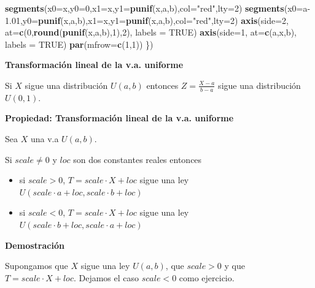 \documentclass[]{book}
\newenvironment{Shaded}{\begin{snugshade}}{\end{snugshade}}
\newcommand{\DataTypeTok}[1]{\textcolor[rgb]{0.13,0.29,0.53}{#1}}
\newcommand{\DecValTok}[1]{\textcolor[rgb]{0.00,0.00,0.81}{#1}}
\newcommand{\FloatTok}[1]{\textcolor[rgb]{0.00,0.00,0.81}{#1}}
\newcommand{\KeywordTok}[1]{\textcolor[rgb]{0.13,0.29,0.53}{\textbf{#1}}}
\newcommand{\NormalTok}[1]{#1}
\newcommand{\OtherTok}[1]{\textcolor[rgb]{0.56,0.35,0.01}{#1}}
\newcommand{\StringTok}[1]{\textcolor[rgb]{0.31,0.60,0.02}{#1}}
\providecommand{\tightlist}{%
  \setlength{\itemsep}{0pt}\setlength{\parskip}{0pt}}
\begin{document}
\begin{Shaded}
\begin{Highlighting}[]
  \KeywordTok{segments}\NormalTok{(}\DataTypeTok{x0=}\NormalTok{x,}\DataTypeTok{y0=}\DecValTok{0}\NormalTok{,}\DataTypeTok{x1=}\NormalTok{x,}\DataTypeTok{y1=}\KeywordTok{punif}\NormalTok{(x,a,b),}\DataTypeTok{col=}\StringTok{"red"}\NormalTok{,}\DataTypeTok{lty=}\DecValTok{2}\NormalTok{)}
  \KeywordTok{segments}\NormalTok{(}\DataTypeTok{x0=}\NormalTok{a}\FloatTok{-1.01}\NormalTok{,}\DataTypeTok{y0=}\KeywordTok{punif}\NormalTok{(x,a,b),}\DataTypeTok{x1=}\NormalTok{x,}\DataTypeTok{y1=}\KeywordTok{punif}\NormalTok{(x,a,b),}\DataTypeTok{col=}\StringTok{"red"}\NormalTok{,}\DataTypeTok{lty=}\DecValTok{2}\NormalTok{)}
  \KeywordTok{axis}\NormalTok{(}\DataTypeTok{side=}\DecValTok{2}\NormalTok{, }\DataTypeTok{at=}\KeywordTok{c}\NormalTok{(}\DecValTok{0}\NormalTok{,}\KeywordTok{round}\NormalTok{(}\KeywordTok{punif}\NormalTok{(x,a,b),}\DecValTok{1}\NormalTok{),}\DecValTok{2}\NormalTok{), }\DataTypeTok{labels =} \OtherTok{TRUE}\NormalTok{)}
  \KeywordTok{axis}\NormalTok{(}\DataTypeTok{side=}\DecValTok{1}\NormalTok{, }\DataTypeTok{at=}\KeywordTok{c}\NormalTok{(a,x,b), }\DataTypeTok{labels =} \OtherTok{TRUE}\NormalTok{)}
  \KeywordTok{par}\NormalTok{(}\DataTypeTok{mfrow=}\KeywordTok{c}\NormalTok{(}\DecValTok{1}\NormalTok{,}\DecValTok{1}\NormalTok{))}
\NormalTok{\})}
\end{Highlighting}
\end{Shaded}

\textbf{Transformación lineal de la v.a. uniforme}

Si \(X\) sigue una distribución \(U(a,b)\) entonces \(Z=\frac{X-a}{b-a}\) sigue una distribución \(U(0,1)\).

\textbf{Propiedad: Transformación lineal de la v.a. uniforme}

Sea \(X\) una v.a \(U(a,b)\).

Si \(scale\not=0\) y \(loc\) son dos constantes reales entonces

\begin{itemize}
\tightlist
\item
  si \(scale>0\), \(T=scale\cdot X+loc\) sigue una ley \(U(scale\cdot a +loc,scale\cdot b +loc)\)\\
\item
  si \(scale<0\), \(T=scale\cdot X+loc\) sigue una ley \(U(scale\cdot b +loc,scale\cdot a +loc)\)
\end{itemize}

\textbf{Demostración}

Supongamos que \(X\) sigue una ley \(U(a,b)\), que \(scale>0\) y que \(T=scale\cdot X+loc\). Dejamos el caso \(scale<0\) como ejercicio.
\end{document}
